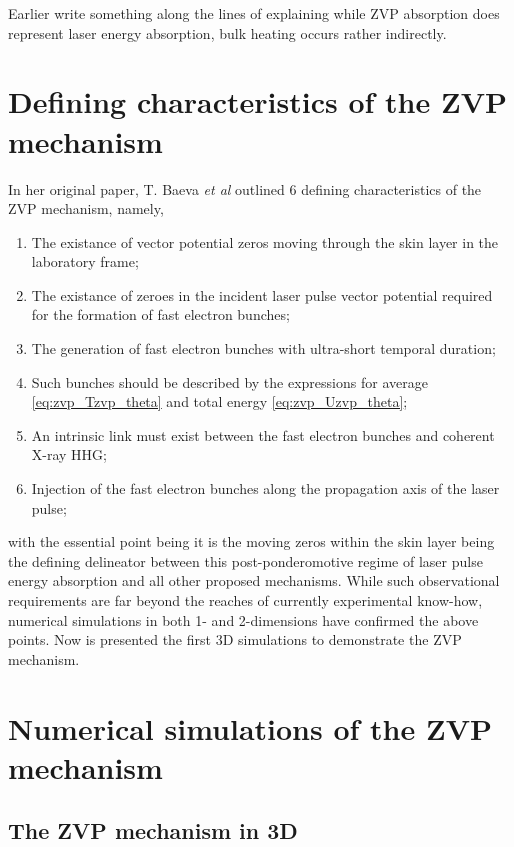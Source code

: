 Earlier write something along the lines of explaining while ZVP absorption does represent laser energy absorption, bulk heating occurs rather indirectly.

\section{Defining characteristics of the ZVP mechanism}
In her original paper, T. Baeva \textit{et al} \cite{baeva_2011_ZeroVectorPotential} outlined 6 defining characteristics of the \ac{ZVP} mechanism, namely,
\begin{enumerate}
	\item The existance of vector potential zeros moving through the skin layer in the laboratory frame;
	\item The existance of zeroes in the incident laser pulse vector potential required for the formation of fast electron bunches;
	\item The generation of fast electron bunches with ultra-short temporal duration;
	\item Such bunches should be described by the expressions for average \ref{eq:zvp_Tzvp_theta} and total energy \ref{eq:zvp_Uzvp_theta};
	\item An intrinsic link must exist between the fast electron bunches and coherent X-ray \ac{HHG};
	\item Injection of the fast electron bunches along the propagation axis of the laser pulse;
\end{enumerate}
with the essential point being it is the moving zeros within the skin layer being the defining delineator between this post-ponderomotive regime of laser pulse energy absorption and all other proposed mechanisms. While such observational requirements are far beyond the reaches of currently experimental know-how, numerical simulations in both 1- \cite{baeva_2011_ZeroVectorPotential} and 2-dimensions \cite{savin_2017_AttosecondscaleAbsorptionExtreme} have confirmed the above points. Now is presented the first \ac{3D} simulations to demonstrate the \ac{ZVP} mechanism.

\section{Numerical simulations of the ZVP mechanism}
\subsection{The ZVP mechanism in 3D}




